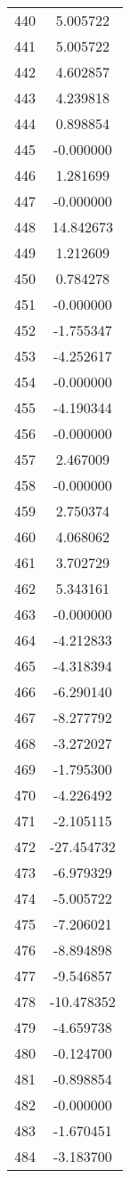 \documentclass[12pt]{article}
\begin{document}
\begin{longtable}{@{}cc@{}}
440 & 5.005722 \\
441 & 5.005722 \\
442 & 4.602857 \\
443 & 4.239818 \\
444 & 0.898854 \\
445 & -0.000000 \\
446 & 1.281699 \\
447 & -0.000000 \\
448 & 14.842673 \\
449 & 1.212609 \\
450 & 0.784278 \\
451 & -0.000000 \\
452 & -1.755347 \\
453 & -4.252617 \\
454 & -0.000000 \\
455 & -4.190344 \\
456 & -0.000000 \\
457 & 2.467009 \\
458 & -0.000000 \\
459 & 2.750374 \\
460 & 4.068062 \\
461 & 3.702729 \\
462 & 5.343161 \\
463 & -0.000000 \\
464 & -4.212833 \\
465 & -4.318394 \\
466 & -6.290140 \\
467 & -8.277792 \\
468 & -3.272027 \\
469 & -1.795300 \\
470 & -4.226492 \\
471 & -2.105115 \\
472 & -27.454732 \\
473 & -6.979329 \\
474 & -5.005722 \\
475 & -7.206021 \\
476 & -8.894898 \\
477 & -9.546857 \\
478 & -10.478352 \\
479 & -4.659738 \\
480 & -0.124700 \\
481 & -0.898854 \\
482 & -0.000000 \\
483 & -1.670451 \\
484 & -3.183700 \\

\end{longtable}
\end{document}
